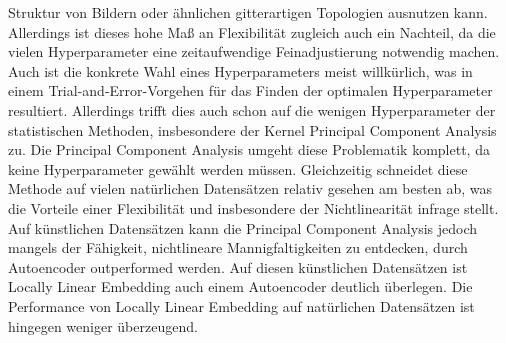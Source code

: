 Struktur von Bildern oder ähnlichen gitterartigen Topologien ausnutzen kann. Allerdings ist dieses
hohe Maß an Flexibilität zugleich auch ein Nachteil, da die vielen Hyperparameter eine
zeitaufwendige Feinadjustierung notwendig machen. Auch ist die konkrete Wahl eines Hyperparameters
meist willkürlich, was in einem Trial-and-Error-Vorgehen für das Finden der optimalen
Hyperparameter resultiert. Allerdings trifft dies auch schon auf die wenigen Hyperparameter der
statistischen Methoden, insbesondere der Kernel Principal Component Analysis zu. Die Principal
Component Analysis umgeht diese Problematik komplett, da keine Hyperparameter gewählt werden
müssen. Gleichzeitig schneidet diese Methode auf vielen natürlichen Datensätzen relativ gesehen am
besten ab, was die Vorteile einer Flexibilität und insbesondere der Nichtlinearität infrage stellt.
Auf künstlichen Datensätzen kann die Principal Component Analysis jedoch mangels der Fähigkeit,
nichtlineare Mannigfaltigkeiten zu entdecken, durch Autoencoder outperformed werden. Auf diesen
künstlichen Datensätzen ist Locally Linear Embedding auch einem Autoencoder deutlich überlegen. Die
Performance von Locally Linear Embedding auf natürlichen Datensätzen ist hingegen weniger
überzeugend.


